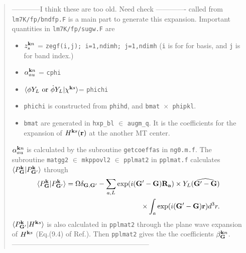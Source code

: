 \documentclass[a4paper,10pt,epsf,fleqn]{article}
\begin{document}
\begin{quote}
\vspace{8mm}
------------I think these are too old. Need check -------------
 called from 
{\tt lm7K/fp/bndfp.F} is a main part to generate this expansion.
Important quantities in {\tt lm7K/fp/sugw.F} are
\begin{itemize}
\item 
$z^{{\bf k}n}_s$ = {\tt zegf(i,j); i=1,ndimh; {\tt j=1,ndimh}} 
({\tt i} is for for basis, and {\tt j} is for band index.)
	
\item 
$\alpha^{{\bf k} n}_{au}$ = {\tt cphi}

\item
$\langle \phi Y_L {\ \rm or \ } \dot{\phi}Y_L|\chi^{{\bf k}s} \rangle$= {\tt phichi} 
	
\item 
{\tt phichi} is constructed from {\tt phihd}, and {\tt bmat $\times$ phipkl}.

\item 
{\tt bmat} are generated in {\tt hxp\_bl} $\in$ {\tt augm\_q}.
It is the coefficients for the expansion of $H^{{\bf k}s}({\bf r})$ 
at the another MT center.

\end{itemize}

\noindent [${\tt QpGcutHakel}$ is assumed as $={\tt 1.5*QpGcut\_psi}$ now.
{\underline But it is not justified enough.}
You will be able to utilize more reasonable ones
which was used in the LDA calculations.]

\noindent $\alpha^{{\bf k} n}_{au}$ is calculated by the subroutine {\tt getcoeffas} in 
{\tt ng0.m.f}.
The subroutine {\tt matgg2} $\in$ {\tt mkppovl2} $\in$ {\tt pplmat2} in {\tt pplmat.f} calculates
$\langle P^{\bf k}_{\bf G}|P^{\bf k}_{{\bf G}'} \rangle$ through
\begin{eqnarray}
\langle P^{\bf k}_{\bf G}|P^{\bf k}_{{\bf G}'} \rangle
= \Omega \delta_{{\bf G},{\bf G}'} -  
\sum_{a,L} \exp( i ({\bf G}'-{\bf G}) {\bf R_a}) 
\times Y_L(\widehat{{\bf G}'-{\bf G}}) \nonumber \\
\times \int_{a} \exp(i({\bf G}'-{\bf G}){\bf r}) d^3r.
\end{eqnarray}
$\langle P^{\bf k}_{{\bf G}'}| H^{{\bf k}s} \rangle$ is also calculated
in {\tt pplmat2} through the plane wave expansion of $H^{{\bf k}s}$
(Eq.(9.4) of Ref.\cite{bott98}). Then {\tt pplmat2} gives the
the coefficients $\beta^{{\bf k}n}_{\bf G}$.\\
-----------------------------------------------------------
\end{quote}
\end{document}
